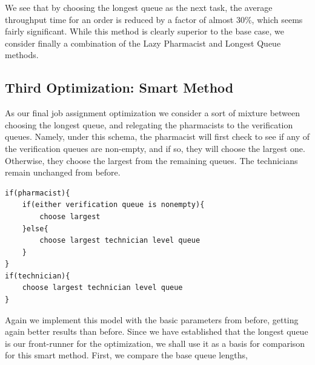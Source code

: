 \documentclass[10pt]{report}            %
\begin{document}
We see that by choosing the longest queue as the next task, the average throughput time for an order is reduced by a factor of almost $30\%$, which seems fairly significant. While this method is clearly superior to the base case, we consider finally a combination of the Lazy Pharmacist and Longest Queue methods.
\subsection*{Third Optimization: Smart Method}
As our final job assignment optimization we consider a sort of mixture between choosing the longest queue, and relegating the pharmacists to the verification queues. Namely, under this schema, the pharmacist will first check to see if any of the verification queues are non-empty, and if so, they will choose the largest one. Otherwise, they choose the largest from the remaining queues. The technicians remain unchanged from before.
\begin{verbatim}
if(pharmacist){
    if(either verification queue is nonempty){
        choose largest
    }else{
        choose largest technician level queue
    }
}
if(technician){
    choose largest technician level queue
}
\end{verbatim}
Again we implement this model with the basic parameters from before, getting again better results than before. Since we have established that the longest queue is our front-runner for the optimization, we shall use it as a basis for comparison for this smart method. First, we compare the base queue lengths,
\end{document}

